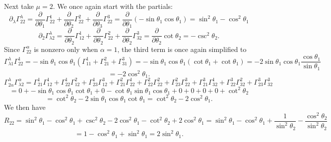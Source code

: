 \documentclass[11pt, letterpaper]{article}
\begin{document}
Next take $\mu =2$. We once again start with the partials:
\[
	\partial _\lambda \Gamma^\lambda _{22} =\frac{\partial }{\partial \theta _1} \Gamma ^1_{22} + \frac{\partial }{\partial \theta _2} \Gamma ^2_{22} + \frac{\partial }{\partial \theta _3} \Gamma ^3_{22} = \frac{\partial }{\partial \theta _1} \left( - \sin \theta _1 \cos \theta _1 \right) = \sin ^2\theta _1 - \cos ^2\theta _1
\]
\[
	\partial _2\Gamma ^\lambda _{\lambda 2} =\frac{\partial }{\partial \theta _2} \Gamma ^1_{12} + \frac{\partial }{\partial \theta _2} \Gamma ^2_{22} + \frac{\partial }{\partial \theta _2} \Gamma ^3_{32} = \frac{\partial }{\partial \theta _2} \cot \theta _2 = -\csc ^2 \theta _2
.\]
Since $\Gamma ^\alpha _{22} $ is nonzero only when $\alpha =1$, the third term is once again simplified to
\[
	\Gamma^\lambda _{\lambda 1} \Gamma ^1_{22} =-\sin \theta _1 \cos \theta _1 \left( \Gamma ^1_{11} +\Gamma ^2_{21} +\Gamma ^3_{31}  \right) =-\sin \theta _1 \cos \theta _1\left( \cot \theta _1 + \cot \theta _1 \right) =-2 \sin \theta _1 \cos \theta _1 \frac{\cos \theta _1}{\sin \theta _1}
\]
\[
	 =-2 \cos ^2\theta _1
.\]
\[
	\Gamma ^\lambda_{2\alpha } \Gamma ^\alpha _{\lambda 2}=\Gamma ^1_{21}\Gamma ^1_{12} +\Gamma ^1_{22} \Gamma ^2_{12} +\Gamma ^1_{23} \Gamma ^3_{12} +\Gamma ^2_{21} \Gamma ^1_{22} +\Gamma ^2_{22} \Gamma ^2_{22} +\Gamma ^2_{23} \Gamma ^3_{22} +\Gamma ^3_{21} \Gamma ^1_{32} +\Gamma ^3_{22} \Gamma ^2_{32} +\Gamma ^3_{23} \Gamma ^3_{32} 
\]
\[
	=0+-\sin \theta _1 \cos \theta _1 \cot \theta _1+0-\cot \theta _1 \sin \theta _1 \cos \theta _1+0+0+0+0+\cot ^2 \theta _2
\]
\[
	=\cot ^2\theta _2 - 2 \sin \theta _1 \cos \theta _1 \cot \theta _1=\cot ^2\theta _2 - 2 \cos ^2\theta _1
.\]
We then have
\[
	R_{22} =\sin ^2\theta _1-\cos ^2\theta _1 + \csc ^2\theta _2 - 2 \cos ^2\theta _1 - \cot ^2\theta _2 + 2 \cos ^2\theta _1= \sin ^2\theta _1 - \cos ^2\theta _1 + \frac{1}{\sin ^2\theta _2} -\frac{\cos ^2\theta _2}{\sin^2\theta _2} 
\]
\[
	=1 - \cos ^2\theta _1 + \sin ^2\theta _1 = 2 \sin ^2\theta _1
.\]
\end{document}
